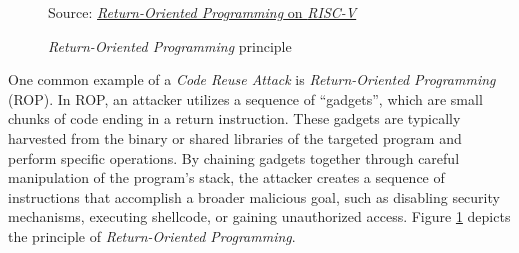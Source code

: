 \begin{figure}
  \centering
  \def\stackalignment{r} %
  {\scriptsize \parbox[t]{\linewidth}{Source: \href{http://dx.doi.org/10.1145/3320269.3384738}{\textit{Return-Oriented Programming} on \textit{RISC-V}}\cite{rop}}}
  \caption{\textit{Return-Oriented Programming} principle}
  \label{fig:rop}
\end{figure}

One common example of a \textit{Code Reuse Attack} is \textit{Return-Oriented
Programming} (ROP). In ROP, an attacker utilizes a sequence of ``gadgets'', which
are small chunks of code ending in a return instruction. These gadgets are
typically harvested from the binary or shared libraries of the targeted program
and perform specific operations. By chaining gadgets together through careful manipulation
of the program's stack, the attacker creates a sequence of instructions that
accomplish a broader malicious goal, such as disabling security mechanisms,
executing shellcode, or gaining unauthorized access. Figure \ref{fig:rop}
depicts the principle of \textit{Return-Oriented Programming}.

